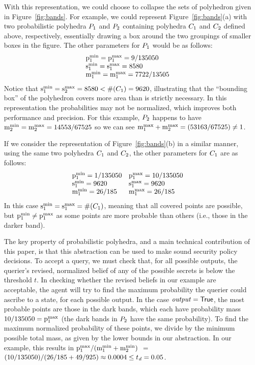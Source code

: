 With this representation, we could choose to collapse the sets of
polyhedron given in Figure~\ref{fig:bands}.  For example, we could
represent Figure~\ref{fig:bands}(a) with two probabilistic polyhedra
$P_{1}$ and $P_{2}$ containing polyhedra $C_{1}$ and
$C_{2}$ defined above, respectively, essentially drawing a
box around the two groupings of smaller boxes in the figure.  The
other parameters for $P_{1}$ would be as follows:
$$
\begin{array}{l}
\mathrm{p}^\mathrm{min}_{1} = \mathrm{p}^\mathrm{max}_{1} = 9/135050 \\
\mathrm{s}^\mathrm{min}_{1} = \mathrm{s}^\mathrm{max}_{1} = 8580 \\
\mathrm{m}^\mathrm{min}_{1} = \mathrm{m}^\mathrm{max}_{1} = 7722/13505 \\
\end{array}
$$
Notice that $\mathrm{s}^\mathrm{min}_{1} = \mathrm{s}^\mathrm{max}_{2} = 8580 < \#(C_{1}) = 9620$,
illustrating that the ``bounding box'' of the polyhedron covers more area
than is strictly necessary.  In this representation the probabilities may
not be normalized, which improves both performance and precision.  For this
example, $P_{2}$ happens to have $\mathrm{m}^\mathrm{min}_{2} = \mathrm{m}^\mathrm{max}_{2} = 14553 / 67525 $ so we
can see $\mathrm{m}^\mathrm{max}_{1} + \mathrm{m}^\mathrm{max}_{2} = (53163 / 67525) \not= 1$.  

If we consider the representation of
Figure~\ref{fig:bands}(b) in a similar manner, using the same two polyhedra
$C_{1}$ and $C_{2}$, the other parameters for $C_{1}$ are
as follows:
$$
\begin{array}{ll}
\mathrm{p}^\mathrm{min}_{1} = 1/135050 & \mathrm{p}^\mathrm{max}_{1} = 10/135050 \\
\mathrm{s}^\mathrm{min}_{1} = 9620 & \mathrm{s}^\mathrm{max}_{1} = 9620 \\
\mathrm{m}^\mathrm{min}_{1} = 26/185 & \mathrm{m}^\mathrm{max}_{1} = 26/185 \\
\end{array}
$$
In this case $\mathrm{s}^\mathrm{min}_{1} = \mathrm{s}^\mathrm{max}_{1} = \#(C_{1})$, meaning that all
covered points are possible, but $\mathrm{p}^\mathrm{min}_{1} \not= \mathrm{p}^\mathrm{max}_{1}$ as some points
are more probable than others (i.e., those in the darker band).

The key property of probabilistic polyhedra, and a main technical
contribution of this paper, is that this abstraction can be used to make
sound security policy decisions.  To accept a query, we must check that, for
all possible outputs, the querier's revised, normalized belief of any of the
possible secrets is below the threshold $t$.  In checking whether the
revised beliefs in our example are acceptable, the agent will try to find
the maximum probability the querier could ascribe to a state, for each
possible output.  In the case $\mathit{output} = \mathsf{True}$, the most probable
points are those in the dark bands, which each have probability mass
$10/135050 = \mathrm{p}^\mathrm{max}_{1}$ (the dark bands in $P_{2}$ have the same
probability).
To find the maximum normalized probability of these points, we divide by the
minimum possible total mass, as given by the lower bounds in our
abstraction.  In our example, this results in $\mathrm{p}^\mathrm{max}_{1} / (\mathrm{m}^\mathrm{min}_{1} +
\mathrm{m}^\mathrm{min}_{2})$ $=$ $(10/135050) / (26/185 + 49/925) \approx 0.0004 \leq t_{\mathit{d}} = 0.05$.

